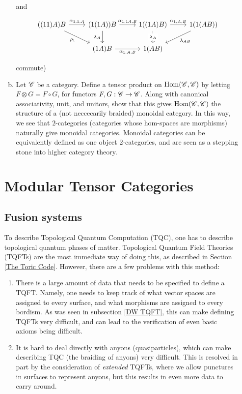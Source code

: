 \documentclass{article}
\theoremstyle{definition}
\numberwithin{figure}{section}
\begin{document}
\begin{enumerate}[\thesection .1.]
\begin{enumerate}[(a)]
and

\[\begin{tikzcd}
	{((11)A)B} & {(1(1A))B} & {1((1A)B)} & {1(1(AB))} \\
	& {(1A)B} & {1(AB)}
	\arrow["{\alpha_{1,1,A}}", from=1-1, to=1-2]
	\arrow["{\alpha_{1,1A,B}}", from=1-2, to=1-3]
	\arrow["{\alpha_{1,A,B}}", from=1-3, to=1-4]
	\arrow["{\lambda_{AB}}", from=1-4, to=2-3]
	\arrow["{\alpha_{1,A,B}}"', from=2-2, to=2-3]
	\arrow["{\lambda_A}"', from=1-2, to=2-2]
	\arrow["{\lambda_A}"{description}, from=1-3, to=2-3]
	\arrow["{\rho_1}"', from=1-1, to=2-2]
\end{tikzcd}\]

commute)

\item Let $\mathscr{C}$ be a category. Define a tensor product on $\bold{\mathrm{Hom}}(\mathscr{C},\mathscr{C})$ by letting $F\otimes G=F\circ G$, for functors $F,G:\mathscr{C}\to \mathscr{C}$. Along with canonical associativity, unit, and unitors, show that this gives $\bold{\mathrm{Hom}}(\mathscr{C},\mathscr{C})$ the structure of a (not neccecarily braided) monoidal category. In this way, we see that $2$-categories (categories whose hom-spaces are morphisms) naturally give monoidal categories. Monoidal categories can be equivalently defined as one object $2$-categories, and are seen as a stepping stone into higher category theory.

\end{enumerate}

\section{Modular Tensor Categories}
\label{Modular Tensor Categories}

\subsection{Fusion systems}
\label{Fusion systems}

To describe Topological Quantum Computation (TQC), one has to describe topological quantum phases of matter. Topological Quantum Field Theories (TQFTs) are the most immediate way of doing this, as described in Section \ref{The Toric Code}. However, there are a few problems with this method:

\begin{enumerate}
\item There is a large amount of data that needs to be specified to define a TQFT. Namely, one needs to keep track of what vector spaces are assigned to every surface, and what morphisms are assigned to every bordism. As was seen in subsection \ref{DW TQFT}, this can make defining TQFTs very difficult, and can lead to the verification of even basic axioms being difficult.
\item It is hard to deal directly with anyons (quasiparticles), which can make describing TQC (the braiding of anyons) very difficult. This is resolved in part by the consideration of \textit{extended} TQFTs, where we allow punctures in surfaces to represent anyons, but this results in even more data to carry around.
\end{enumerate}


\end{enumerate}
\end{document}
